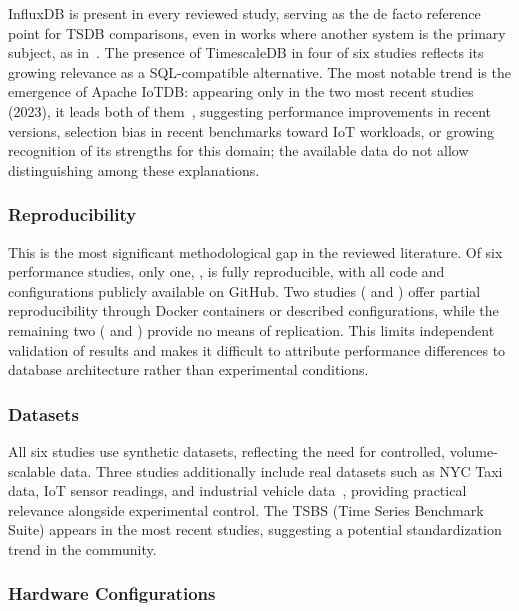 InfluxDB is present in every reviewed study, serving as the de
facto reference point for TSDB comparisons, even in works where another system is the
primary subject, as in~\cite{wang2023iotdb}. The presence of TimescaleDB in four of six
studies reflects its growing relevance as a SQL-compatible alternative. The most notable
trend is the emergence of Apache IoTDB: appearing only in the two most recent studies
(2023), it leads both of them~\citep{pereira2023mulletbench,wang2023iotdb}, suggesting performance improvements in recent versions, selection bias in recent benchmarks
toward IoT workloads, or growing recognition of its strengths for this domain; the
available data do not allow distinguishing among these explanations.

\subsubsection{Reproducibility}

This is the most significant methodological gap in the reviewed
literature. Of six performance studies, only one, \cite{pereira2023mulletbench},
is fully reproducible, with all code and configurations publicly available on GitHub.
Two studies (\cite{lima2024avaliando} and \cite{wang2023iotdb}) offer partial reproducibility
through Docker containers or described configurations, while the remaining two
(\cite{shah2022performance} and \cite{naqvi2017influxdb}) provide no means of replication.
This limits independent validation of results and makes it difficult to attribute performance
differences to database architecture rather than experimental conditions.

\subsubsection{Datasets}

All six studies use synthetic datasets, reflecting the need for
controlled, volume-scalable data. Three studies additionally include real datasets such as
NYC Taxi data, IoT sensor readings, and industrial vehicle data~\citep{shah2022performance,
naqvi2017influxdb,wang2023iotdb}, providing practical relevance alongside experimental
control. The TSBS (Time Series Benchmark Suite) appears in the most recent studies,
suggesting a potential standardization trend in the community.

\subsubsection{Hardware Configurations}

